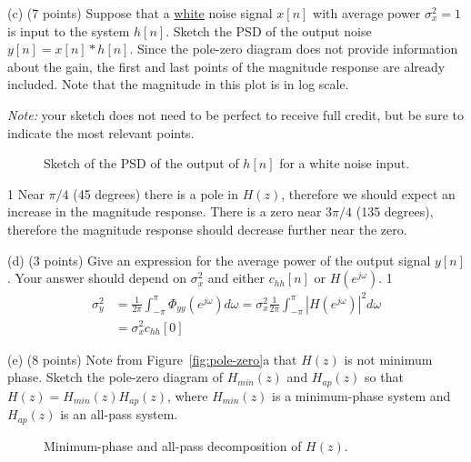 \documentclass[10pt]{article}
\def\SOLUTIONS{0} %
\def\SolutionsColor{red2}
\begin{document}
\begin{description}
\item{(c)} (7 points) Suppose that a \underline{white} noise signal $x[n]$ with average power $\sigma_x^2 = 1$ is input to the system $h[n]$. Sketch the PSD of the output noise $y[n] = x[n]\ast h[n]$. Since the pole-zero diagram does not provide information about the gain, the first and last points of the magnitude response are already included. Note that the magnitude in this plot is in log scale.

\textit{Note:} your sketch does not need to be perfect to receive full credit, but be sure to indicate the most relevant points.

\begin{figure}[!h]
	\centering
	\resizebox{0.6\textwidth}{!}{}
    \caption{Sketch of the PSD of the output of $h[n]$ for a white noise input.} \label{fig:mag-resp}
\end{figure}

\if\SOLUTIONS1
{\color{\SolutionsColor}
Near $\pi/4$ (45 degrees) there is a pole in $H(z)$, therefore we should expect an increase in the magnitude response. There is a zero near $3\pi/4$ (135 degrees), therefore the magnitude response should decrease further near the zero.
}
\else\vspace{2cm}
\fi

\item{(d)} (3 points) Give an expression for the average power of the output signal $y[n]$. Your answer should depend on $\sigma_x^2$ and either $c_{hh}[n]$ or $H(e^{j\omega})$.
\if\SOLUTIONS1
{\color{\SolutionsColor}
\begin{align*}
\sigma_y^2 &= \frac{1}{2\pi}\int_{-\pi}^{\pi}\Phi_{yy}(e^{j\omega})d\omega = \sigma_x^2\frac{1}{2\pi}\int_{-\pi}^{\pi}|H(e^{j\omega})|^2d\omega \\
&=\sigma_x^2c_{hh}[0]
\end{align*}
}
\else\vspace{6cm}
\fi

\item{(e)} (8 points) Note from Figure~\ref{fig:pole-zero}a that $H(z)$ is not minimum phase. Sketch the pole-zero diagram of $H_{min}(z)$ and $H_{ap}(z)$ so that $H(z) = H_{min}(z)H_{ap}(z)$, where $H_{min}(z)$ is a minimum-phase system and $H_{ap}(z)$ is an all-pass system. 
\end{description}

\begin{figure}[!h]
\centering
	\resizebox{\textwidth}{!}{}
    \caption{Minimum-phase and all-pass decomposition of $H(z)$.} \label{fig:min-all-pass}
\end{figure}
\end{document}
